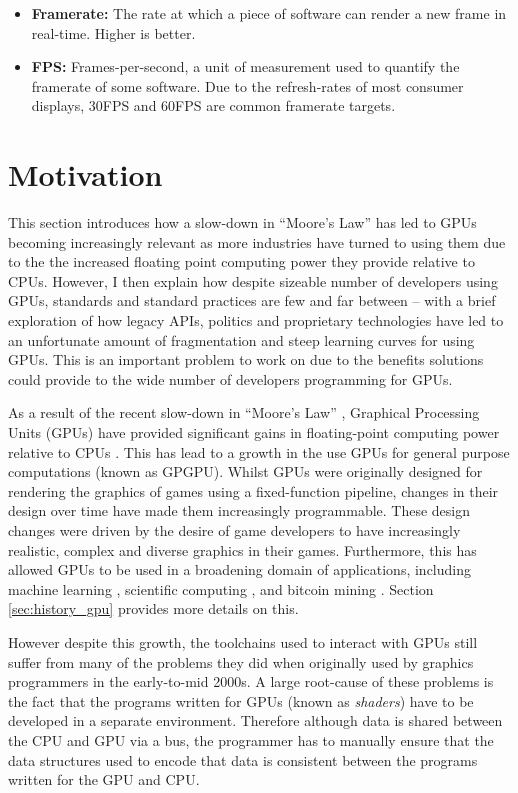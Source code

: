 \documentclass[a4paper,12pt,twoside,openright]{report}
\begin{document}
\begin{itemize}
    \item \textbf{Framerate:} The rate at which a piece of software can render
    a new frame in real-time. Higher is better.

    \item \textbf{FPS:} Frames-per-second, a unit of measurement used to
    quantify the framerate of some software. Due to the refresh-rates of most
    consumer displays, 30FPS and 60FPS are common framerate targets.

\end{itemize}

\section{Motivation}

This section introduces how a slow-down in ``Moore's Law'' has led to GPUs
becoming increasingly relevant as more industries have turned to using them due
to the the increased floating point computing power they provide relative to
CPUs. However, I then explain how despite sizeable number of developers using
GPUs, standards and standard practices are few and far between -- with a brief
exploration of how legacy APIs, politics and proprietary technologies have led
to an unfortunate amount of fragmentation and steep learning curves for using
GPUs. This is an important problem to work on due to the benefits solutions
could provide to the wide number of developers programming for GPUs.

As a result of the recent slow-down in ``Moore's Law'' \cite{MooreLawSlowdown},
Graphical Processing Units (GPUs) have provided significant gains in
floating-point computing power relative to CPUs \cite{CPUGPUOverTime}. This has
lead to a growth in the use GPUs for general purpose computations (known as
GPGPU). Whilst GPUs were originally designed for rendering the graphics of
games using a fixed-function pipeline, changes in their design over time have
made them increasingly programmable. These design changes were driven by the
desire of game developers to have increasingly realistic, complex and diverse
graphics in their games. Furthermore, this has allowed GPUs to be used in a
broadening domain of applications, including machine learning \cite{TODO},
scientific computing \cite{TODO}, and bitcoin mining \cite{TODO}. Section
\ref{sec:history_gpu} provides more details on this.

However despite this growth, the toolchains used to interact with GPUs still
suffer from many of the problems they did when originally used by graphics
programmers in the early-to-mid 2000s. A large root-cause of these problems is
the fact that the programs written for GPUs (known as \textit{shaders}) have to
be developed in a separate environment. Therefore although data is shared
between the CPU and GPU via a bus, the programmer has to manually ensure that
the data structures used to encode that data is consistent between the programs
written for the GPU and CPU.
\end{document}
